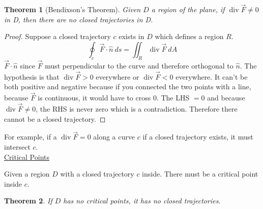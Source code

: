 \documentclass[12pt]{article}
\numberwithin{equation}{subsection}
\newtheorem{theorem}{Theorem}[section]
\DeclareMathOperator{\vdiv}{div}
\begin{document}
\begin{theorem}[Bendixson's Theorem]
Given $D$ a region of the plane, if $\vdiv \vec{F} \neq 0$ in D, then there are no closed trajectories in D.

\end{theorem}

\begin{proof}
Suppose a closed trajectory $c$ exists in $D$ which defines a region $R$.
\begin{equation}
\oint_c \vec{F} \cdot \hat{n}\ ds = \iint_R \vdiv \vec{F}\ dA
\end{equation}
$\vec{F} \cdot \hat{n}$ since $\vec{F}$ must perpendicular to the curve and therefore orthogonal to $\hat{n}$. The hypothesis is that $\vdiv \vec{F} > 0$ everywhere or $\vdiv \vec{F} < 0$ everywhere. It can't be both positive and negative because if you connected the two points with a line, because $\vec{F}$ is continuous, it would have to cross 0. The LHS $=0$ and because $\vdiv \vec{F} \neq 0 $, the RHS is never zero which is a contradiction. Therefore there cannot be a closed trajectory.
\end{proof}

For example, if a $\vdiv \vec{F} = 0$ along a curve $c$ if a closed trajectory exists, it must intersect $c$.\\

\noindent \underline{Critical Points}

\noindent \hspace{.2cm} Given a region $D$ with a closed trajectory $c$ inside. There must be a critical point inside $c$.

\begin{theorem}
If $D$ has no critical points, it has no closed trajectories.
\end{theorem}
\end{document}
